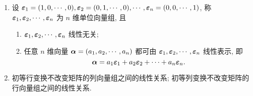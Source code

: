 \begin{enumerate}[label=(\arabic{*})]
    \item 设 $ \vb*{\varepsilon}_{1}=(1,0, \cdots, 0), \vb*{\varepsilon}_{2}=(0,1, \cdots, 0), \cdots, \vb*{\varepsilon}_{n}=(0,0, \cdots, 1) $, 称 $ \vb*{\varepsilon}_{1}, \vb*{\varepsilon}_{2}, \cdots, \vb*{\varepsilon}_{n} $ 为 $ n $ 维单位向量组, 且
          \begin{enumerate}
              \item $\vb*{\varepsilon}_{1}, \vb*{\varepsilon}_{2}, \cdots, \vb*{\varepsilon}_{n} $ 线性无关;
              \item 任意 $ n $ 维向量 $ \vb*{\alpha}=\left(a_{1}, a_{2}, \cdots, a_{n}\right) $ 都可由 $ \vb*{\varepsilon}_{1}, \vb*{\varepsilon}_{2}, \cdots, \vb*{\varepsilon}_{n} $ 线性表示, 即
                    $$\vb*{\alpha}=a_{1} \vb*{\varepsilon}_{1}+a_{2} \vb*{\varepsilon}_{2}+\cdots+a_{n} \vb*{\varepsilon}_{n}.$$
          \end{enumerate}
    \item 初等行变换不改变矩阵的列向量组之间的线性关系; 初等列变换不改变矩阵的行向量组之间的线性关系.
\end{enumerate}

